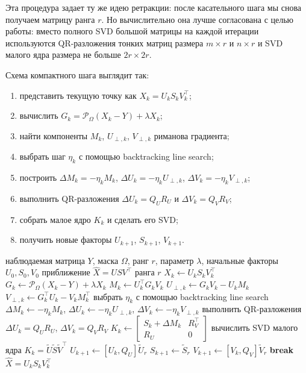 \documentclass[a4paper,12pt]{article}
\renewcommand{\Proj}{\mathcal{P}}
\newcommand{\Mcal}{\mathcal{M}}
\begin{document}
Эта процедура задает ту же идею ретракции: после касательного шага мы снова получаем матрицу ранга $r$. Но вычислительно она лучше согласована с целью работы: вместо полного SVD большой матрицы на каждой итерации используются QR-разложения тонких матриц размера $m\times r$ и $n\times r$ и SVD малого ядра размера не больше $2r\times 2r$.

Схема компактного шага выглядит так:
\begin{enumerate}[label=\arabic*.]
    \item представить текущую точку как $X_k=U_kS_kV_k^\top$;
    \item вычислить $G_k=\Proj_\Omega(X_k-Y)+\lambda X_k$;
    \item найти компоненты $M_k$, $U_{\perp,k}$, $V_{\perp,k}$ риманова градиента;
    \item выбрать шаг $\eta_k$ с помощью backtracking line search;
    \item построить $\Delta M_k=-\eta_kM_k$, $\Delta U_k=-\eta_kU_{\perp,k}$, $\Delta V_k=-\eta_kV_{\perp,k}$;
    \item выполнить QR-разложения $\Delta U_k=Q_UR_U$ и $\Delta V_k=Q_VR_V$;
    \item собрать малое ядро $K_k$ и сделать его SVD;
    \item получить новые факторы $U_{k+1}$, $S_{k+1}$, $V_{k+1}$.
\end{enumerate}

\begin{algorithm}[H]
\caption{Компактный риманов градиентный спуск на $\Mcal_r$}
\label{alg:compact-rgd}
\begin{algorithmic}[1]
\Require наблюдаемая матрица $Y$, маска $\Omega$, ранг $r$, параметр $\lambda$, начальные факторы $U_0,S_0,V_0$
\Ensure приближение $\widehat X=USV^\top$ ранга $r$
    \State $X_k \gets U_kS_kV_k^\top$
    \State $G_k \gets \Proj_\Omega(X_k-Y)+\lambda X_k$
    \State $M_k \gets U_k^\top G_kV_k$
    \State $U_{\perp,k} \gets G_kV_k-U_kM_k$
    \State $V_{\perp,k} \gets G_k^\top U_k-V_kM_k^\top$
    \State выбрать $\eta_k$ с помощью backtracking line search
    \State $\Delta M_k\gets-\eta_kM_k$, $\Delta U_k\gets-\eta_kU_{\perp,k}$, $\Delta V_k\gets-\eta_kV_{\perp,k}$
    \State выполнить QR-разложения $\Delta U_k=Q_UR_U$, $\Delta V_k=Q_VR_V$
    \State $K_k\gets
    \begin{bmatrix}
    S_k+\Delta M_k & R_V^\top\\
    R_U & 0
    \end{bmatrix}$
    \State вычислить SVD малого ядра $K_k=\widetilde U\widetilde S\widetilde V^\top$
    \State $U_{k+1}\gets [U_k,Q_U]\widetilde U_r$
    \State $S_{k+1}\gets \widetilde S_r$
    \State $V_{k+1}\gets [V_k,Q_V]\widetilde V_r$
        \State \textbf{break}
    \EndIf
\EndFor
\State \Return $\widehat X=U_kS_kV_k^\top$
\end{algorithmic}
\end{algorithm}
\end{document}
